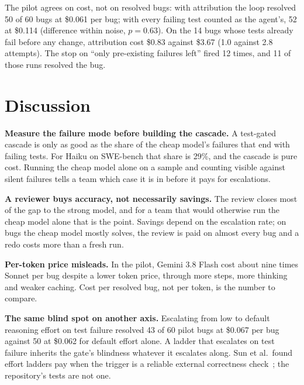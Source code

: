\documentclass[10pt,conference]{IEEEtran}
\begin{document}
The pilot agrees on cost, not on resolved bugs: with attribution the loop resolved 50 of 60 bugs at \$0.061 per
bug; with every failing test counted as the agent's, 52 at \$0.114 (difference within noise, $p=0.63$). On the 14 bugs whose tests already fail before any
change, attribution cost \$0.83 against \$3.67 (1.0 against 2.8 attempts). The stop on ``only pre-existing failures
left'' fired 12 times, and 11 of those runs resolved the bug.

\section{Discussion}
\textbf{Measure the failure mode before building the cascade.} A test-gated cascade is only as good as the share of
the cheap model's failures that end with failing tests. For Haiku on SWE-bench that share is 29\%, and the cascade is
pure cost. Running the cheap model alone on a sample and counting visible against silent failures tells a team which
case it is in before it pays for escalations.

\textbf{A reviewer buys accuracy, not necessarily savings.} The review closes most of the gap to the strong model, and
for a team that would otherwise run the cheap model alone that is the point. Savings depend on the escalation rate;
on bugs the cheap model mostly solves, the review is paid on almost every bug and a redo costs more than a fresh run.

\textbf{Per-token price misleads.} In the pilot, Gemini 3.8 Flash cost about nine times Sonnet per bug despite a lower
token price, through more steps, more thinking and weaker caching. Cost per resolved bug, not per token, is the number
to compare.

\textbf{The same blind spot on another axis.} Escalating from low to default reasoning effort on test failure resolved
43 of 60 pilot bugs at \$0.067 per bug against 50 at \$0.062 for default effort alone. A ladder that escalates on test
failure inherits the gate's blindness whatever it escalates along. Sun et al.\ found effort ladders pay when the trigger is a
reliable external correctness check~\cite{sun2026effort}; the repository's tests are not one.
\end{document}
